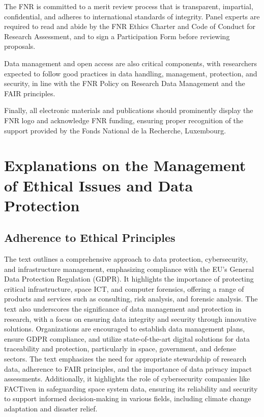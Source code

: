 \documentclass[12pt]{article}
\begin{document}
The FNR is committed to a merit review process that is transparent, impartial, confidential, and adheres to international standards of integrity. Panel experts are required to read and abide by the FNR Ethics Charter and Code of Conduct for Research Assessment, and to sign a Participation Form before reviewing proposals.

Data management and open access are also critical components, with researchers expected to follow good practices in data handling, management, protection, and security, in line with the FNR Policy on Research Data Management and the FAIR principles.

Finally, all electronic materials and publications should prominently display the FNR logo and acknowledge FNR funding, ensuring proper recognition of the support provided by the Fonds National de la Recherche, Luxembourg.

\section{Explanations on the Management of Ethical Issues and Data Protection}

\subsection{Adherence to Ethical Principles}

The text outlines a comprehensive approach to data protection, cybersecurity, and infrastructure management, emphasizing compliance with the EU's General Data Protection Regulation (GDPR). It highlights the importance of protecting critical infrastructure, space ICT, and computer forensics, offering a range of products and services such as consulting, risk analysis, and forensic analysis. The text also underscores the significance of data management and protection in research, with a focus on ensuring data integrity and security through innovative solutions. Organizations are encouraged to establish data management plans, ensure GDPR compliance, and utilize state-of-the-art digital solutions for data traceability and protection, particularly in space, government, and defense sectors. The text emphasizes the need for appropriate stewardship of research data, adherence to FAIR principles, and the importance of data privacy impact assessments. Additionally, it highlights the role of cybersecurity companies like FACTiven in safeguarding space system data, ensuring its reliability and security to support informed decision-making in various fields, including climate change adaptation and disaster relief.
\end{document}
